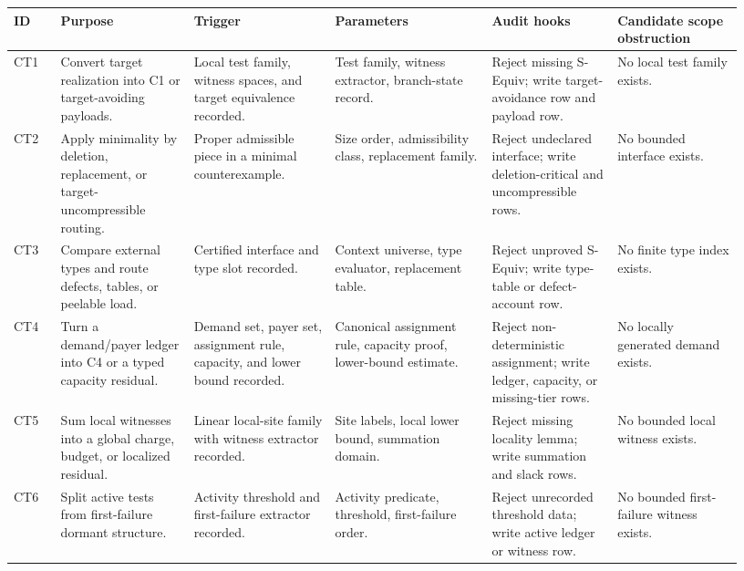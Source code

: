 \documentclass[
  11pt,
]{article}
\theoremstyle{definition}
\begin{document}
\begingroup
\scriptsize
\setlength{\tabcolsep}{1.2pt}
\begin{longtable}[]{@{}
  >{\raggedright\arraybackslash}p{0.06\linewidth}
  >{\raggedright\arraybackslash}p{0.17\linewidth}
  >{\raggedright\arraybackslash}p{0.18\linewidth}
  >{\raggedright\arraybackslash}p{0.20\linewidth}
  >{\raggedright\arraybackslash}p{0.16\linewidth}
  >{\raggedright\arraybackslash}p{0.16\linewidth}@{}}
\toprule\noalign{}
ID & Purpose & Trigger & Parameters & Audit hooks & Candidate scope obstruction \\
\midrule\noalign{}
\endhead
\bottomrule\noalign{}
\endlastfoot
CT1 & Convert target realization into C1 or target-avoiding payloads. & Local test family, witness spaces, and target equivalence recorded. & Test family, witness extractor, branch-state record. & Reject missing S-Equiv; write target-avoidance row and payload row. & No local test family exists. \\
CT2 & Apply minimality by deletion, replacement, or target-uncompressible routing. & Proper admissible piece in a minimal counterexample. & Size order, admissibility class, replacement family. & Reject undeclared interface; write deletion-critical and uncompressible rows. & No bounded interface exists. \\
CT3 & Compare external types and route defects, tables, or peelable load. & Certified interface and type slot recorded. & Context universe, type evaluator, replacement table. & Reject unproved S-Equiv; write type-table or defect-account row. & No finite type index exists. \\
CT4 & Turn a demand/payer ledger into C4 or a typed capacity residual. & Demand set, payer set, assignment rule, capacity, and lower bound recorded. & Canonical assignment rule, capacity proof, lower-bound estimate. & Reject non-deterministic assignment; write ledger, capacity, or missing-tier rows. & No locally generated demand exists. \\
CT5 & Sum local witnesses into a global charge, budget, or localized residual. & Linear local-site family with witness extractor recorded. & Site labels, local lower bound, summation domain. & Reject missing locality lemma; write summation and slack rows. & No bounded local witness exists. \\
CT6 & Split active tests from first-failure dormant structure. & Activity threshold and first-failure extractor recorded. & Activity predicate, threshold, first-failure order. & Reject unrecorded threshold data; write active ledger or witness row. & No bounded first-failure witness exists. \\

\end{longtable}
\end{document}
